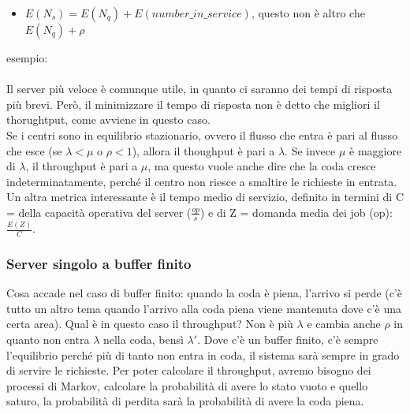 \documentclass{article}
\begin{document}
\begin{itemize}
\item $E(N_s) = E(N_q) + E(number\_in\_service)$, questo non è altro che $E(N_q) + \rho$
\end{itemize}
esempio:\\ 
\\Il server più veloce è comunque utile, in quanto ci saranno dei tempi di risposta più brevi. Però, il minimizzare il tempo di risposta non è detto che migliori il thorughtput, come avviene in questo caso.\\ Se i centri sono in equilibrio stazionario, ovvero il flusso che entra è pari al flusso che esce (se $\lambda < \mu$ o $\rho < 1$), allora il thoughput è pari a $\lambda$. Se invece $\mu$ è maggiore di $\lambda$, il throughput è pari a $\mu$, ma questo vuole anche dire che la coda cresce indeterminatamente, perché il centro non riesce a smaltire le richieste in entrata.\\ Un altra metrica interessante è il tempo medio di servizio, definito in termini di C = della capacità operativa del server ($\frac{op}{s}$) e di Z = domanda media dei job (op): $\frac{E(Z)}{C}$.
\subsubsection{Server singolo a buffer finito}
Cosa accade nel caso di buffer finito: quando la coda è piena, l'arrivo si perde (c'è tutto un altro tema quando l'arrivo alla coda piena viene mantenuta dove c'è una certa area). Qual è in questo caso il throughput? Non è più $\lambda$ e cambia anche $\rho$ in quanto non entra $\lambda$ nella coda, bensì $\lambda'$. Dove c'è un buffer finito, c'è sempre l'equilibrio perché più di tanto non entra in coda, il sistema sarà sempre in grado di servire le richieste. Per poter calcolare il throughput, avremo bisogno dei processi di Markov, calcolare la probabilità di avere lo stato vuoto e quello saturo, la probabilità di perdita sarà la probabilità di avere la coda piena.
\end{document}
